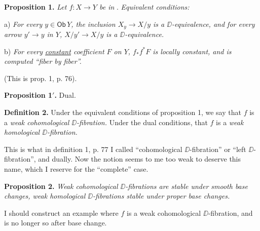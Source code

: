 \textbf{Proposition 1.} \textit{Let $f : X \to Y$ be in} \Dia. \textit{Equivalent conditions:}

a) \textit{For every $y \in \mathsf{Ob}\, Y$, the inclusion $X_y \to X/y$ is a $\DD$-equivalence, and for every arrow $y' \to y$ in $Y$, $X/y' \to X/y$ is a $\DD$-equivalence.}

b) \textit{For every \underline{constant} coefficient $F$ on $Y$, $f_{*}f^{*}F$ is locally constant, and is computed ``fiber by fiber''.}

(This is prop. 1, p. 76).

\textbf{Proposition 1$'$.} Dual.


\textbf{Definition 2.} Under the equivalent conditions of proposition 1, we say that $f$ is a \textit{weak cohomological $\DD$-fibration.} Under the dual conditions, that $f$ is a \textit{weak homological $\DD$-fibration.}

This is what in definition 1, p. 77 I called ``cohomological $\DD$-fibration'' or ``left $\DD$-fibration'', and dually. Now the notion seems to me too weak to deserve this name, which I reserve for the ``complete'' case.

\textbf{Proposition 2.} \textit{Weak cohomological $\DD$-fibrations are stable under smooth base changes, weak homological $\DD$-fibrations stable under proper base changes.}

I should construct an example where $f$ is a weak cohomological $\DD$-fibration, and is no longer so after base change.